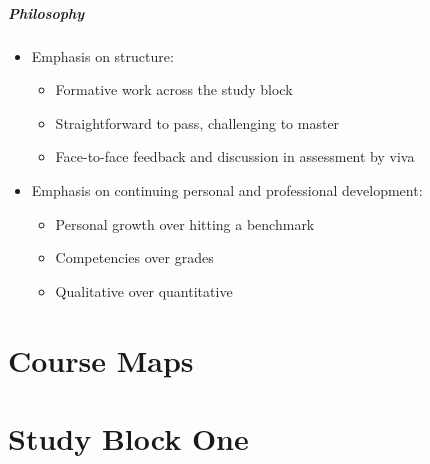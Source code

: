 \begin{frame}
	\frametitle{Philosophy}
	
	\begin{itemize}
		\item Emphasis on structure:
		\begin{itemize}
			\item Formative work across the study block
			\item Straightforward to pass, challenging to master
			\item Face-to-face feedback and discussion in assessment by viva			
		\end{itemize}
		\pause\item Emphasis on continuing personal and professional development:
		\begin{itemize}
			\item Personal growth over hitting a benchmark
			\item Competencies over grades
			\item Qualitative over quantitative			
		\end{itemize}
	\end{itemize}
\end{frame}

\part{Course Maps}
\frame{\partpage}










\part{Study Block One}
\frame{\partpage}

